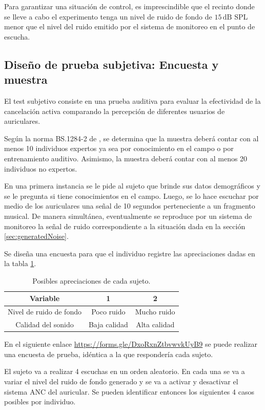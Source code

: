 \documentclass[a4paper,12pt]{article}
\begin{document}
Para garantizar una situación de control, es imprescindible que el recinto donde se lleve a cabo el experimento tenga un nivel de ruido de fondo de $15 \, \si{\deci \bel}$ SPL menor que el nivel del ruido emitido por el sistema de monitoreo en el punto de escucha.

\subsection{Diseño de prueba subjetiva: Encuesta y muestra}
\label{sec:test}

El test subjetivo consiste en una prueba auditiva para evaluar la efectividad de la cancelación activa comparando la percepción de diferentes usuarios de auriculares.

Según la norma BS.1284-2 de \textcite{ITU1284-2}, se determina que la muestra deberá contar con al menos 10 individuos expertos ya sea por conocimiento en el campo o por entrenamiento auditivo.
Asimismo, la muestra deberá contar con al menos 20 individuos no expertos.

En una primera instancia se le pide al sujeto que brinde sus datos demográficos y se le pregunta si tiene conocimientos en el campo.
Luego, se lo hace escuchar por medio de los auriculares una señal de 10 segundos perteneciente a un fragmento musical.
De manera simultánea, eventualmente se reproduce por un sistema de monitoreo la señal de ruido correspondiente a la situación dada en la sección \ref{sec:generatedNoise}.

Se diseña una encuesta para que el individuo registre las apreciaciones dadas en la tabla \ref{tab:appreciations}.

\begin{table}[ht]
\centering
\begin{tabular}{|c|c|c|}
  \hline
  \textbf{Variable} & \textbf{1} & \textbf{2} \\
  \hline
  Nivel de ruido de fondo & Poco ruido & Mucho ruido \\
  \hline
  Calidad del sonido & Baja calidad & Alta calidad \\
  \hline
\end{tabular}
\caption{Posibles apreciaciones de cada sujeto.}
\label{tab:appreciations}
\end{table}

En el siguiente enlace \url{https://forms.gle/DxoRxnZtbvwvkUyB9} se puede realizar una encuesta de prueba, idéntica a la que respondería cada sujeto.

El sujeto va a realizar 4 escuchas en un orden aleatorio.
En cada una se va a variar el nivel del ruido de fondo generado y se va a activar y desactivar el sistema ANC del auricular.
Se pueden identificar entonces los siguientes 4 casos posibles por individuo.
\end{document}
